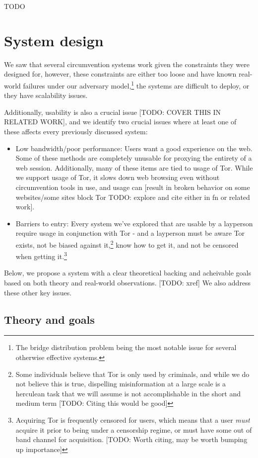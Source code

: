 \documentclass[12pt]{report}
\begin{document}
TODO

\chapter{System design}

We saw that several circumvention systems work given the constraints they were designed for, however, these constraints are either too loose and have known real-world failures under our adversary model,\footnote{The bridge distribution problem being the most notable issue for several otherwise effective systems.} the systems are difficult to deploy, or they have scalability issues.

Additionally, usability is also a crucial issue [TODO: COVER THIS IN RELATED WORK], and we identify two crucial issues where at least one of these affects every previously discussed system:
\begin{itemize}
  \item Low bandwidth/poor performance: Users want a good experience on the web. Some of these methods are completely unusable for proxying the entirety of a web session. Additionally, many of these items are tied to usage of Tor. While we support usage of Tor, it slows down web browsing even without circumvention tools in use, and usage can [result in broken behavior on some websites/some sites block Tor TODO: explore and cite either in fn or related work].
  \item Barriers to entry: Every system we've explored that are usable by a layperson require usage in conjunction with Tor - and a layperson must be aware Tor exists, not be biased against it,\footnote{Some individuals believe that Tor is only used by criminals, and while we do not believe this is true, dispelling misinformation at a large scale is a herculean task that we will assume is not accomplishable in the short and medium term [TODO: Citing this would be good]} know how to get it, and not be censored when getting it.\footnote{Acquiring Tor is frequently censored for users, which means that a user \emph{must} acquire it prior to being under a censorship regime, or must have some out of band channel for acquisition. [TODO: Worth citing, may be worth bumping up importance]}
\end{itemize}

Below, we propose a system with a clear theoretical backing and acheivable goals based on both theory and real-world observations. [TODO: xref] We also address these other key issues.

\section{Theory and goals}
\end{document}
